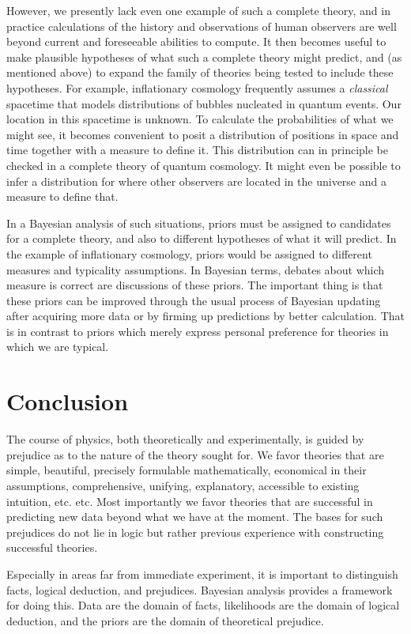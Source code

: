 \documentclass[pra,twocolumn,nofootinbib,eqsecnum,floatfix]{revtex4}
\begin{document}
However, we presently lack even one example of such a complete theory, and in practice
calculations of the history and observations of human observers are well beyond current 
and foreseeable abilities to compute.  
It then becomes useful to make plausible hypotheses of what such a complete theory might predict, and (as  mentioned above) to expand the family of theories being tested to include these hypotheses.  For example, inflationary cosmology frequently assumes a {\it classical} spacetime that models distributions of bubbles nucleated in quantum events. Our location in this spacetime is unknown. To calculate the probabilities of what we might see, it becomes convenient to posit a distribution of positions in space and time together with  a measure to define it.  This distribution can in principle be checked in a complete theory of quantum cosmology. It might even be possible to infer a distribution for where other observers are located in the universe and a measure to define that. 

In a Bayesian analysis of such situations, priors must be assigned to candidates for a complete theory, and also to different hypotheses of what it will predict. 
In the example of inflationary cosmology, priors would be assigned to different measures and typicality assumptions. 
In Bayesian terms, debates about which measure is correct are discussions of these priors.
The important thing is that these priors can be improved through the usual process of Bayesian updating after acquiring more data or by  firming up predictions by better calculation. That is in contrast to priors which merely express personal preference for theories in which we are typical. 

\section{Conclusion}  The course of physics, both theoretically and experimentally, is guided by prejudice as to the nature of the theory sought for. We favor theories that are simple, beautiful, precisely formulable mathematically, economical in their assumptions, comprehensive, unifying, explanatory, accessible to existing intuition, etc. etc. Most importantly we favor theories that are successful in predicting new data beyond what we have at the moment. The bases for such prejudices do not lie in logic but rather previous experience with constructing successful theories. 

Especially in areas far from immediate experiment, it is important to distinguish facts,  logical deduction, and prejudices. Bayesian analysis provides a framework for doing this.  Data are the domain of facts, likelihoods are the domain of logical deduction, and the priors are the domain of theoretical prejudice. 
\end{document}
